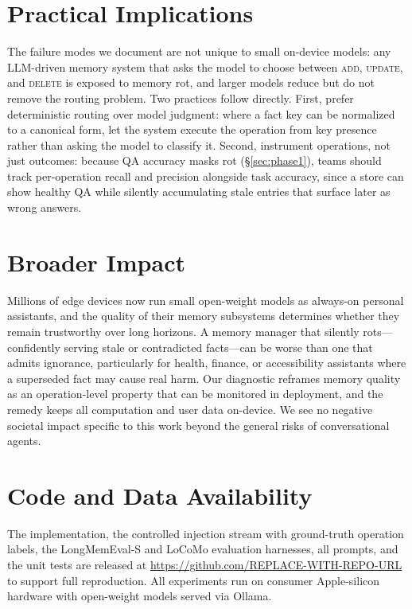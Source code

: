 \documentclass[10pt, twocolumn]{article}
\begin{document}
\section*{Practical Implications}

The failure modes we document are not unique to small on-device models: any
LLM-driven memory system that asks the model to choose between \textsc{add},
\textsc{update}, and \textsc{delete} is exposed to memory rot, and larger models
reduce but do not remove the routing problem. Two practices follow directly.
First, prefer deterministic routing over model judgment: where a fact key can be
normalized to a canonical form, let the system execute the operation from key
presence rather than asking the model to classify it. Second, instrument
operations, not just outcomes: because QA accuracy masks rot
(\S\ref{sec:phase1}), teams should track per-operation recall and precision
alongside task accuracy, since a store can show healthy QA while silently
accumulating stale entries that surface later as wrong answers.

\section*{Broader Impact}

Millions of edge devices now run small open-weight models as always-on personal
assistants, and the quality of their memory subsystems determines whether they
remain trustworthy over long horizons. A memory manager that silently rots---
confidently serving stale or contradicted facts---can be worse than one that
admits ignorance, particularly for health, finance, or accessibility assistants
where a superseded fact may cause real harm. Our diagnostic reframes memory
quality as an operation-level property that can be monitored in deployment, and
the remedy keeps all computation and user data on-device. We see no negative
societal impact specific to this work beyond the general risks of conversational
agents.

\section*{Code and Data Availability}

The implementation, the controlled injection stream with ground-truth operation
labels, the LongMemEval-S and LoCoMo evaluation harnesses, all prompts, and the
unit tests are released at \url{https://github.com/REPLACE-WITH-REPO-URL} to
support full reproduction. All experiments run on consumer Apple-silicon hardware
with open-weight models served via Ollama.



\end{document}
